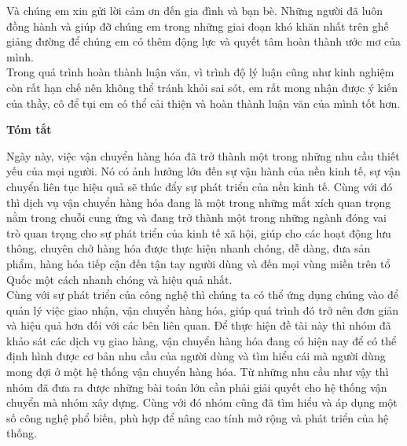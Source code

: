 	Và chúng em xin gửi lời cảm ơn đến gia đình và bạn bè. Những người đã luôn đồng hành và giúp đỡ chúng em trong những giai đoạn khó khăn nhất trên ghế giảng đường để chúng em có thêm động lực và quyết tâm hoàn thành ước mơ của mình.\\
	
	Trong quá trình hoàn thành luận văn, vì trình độ lý luận cũng như kinh nghiệm còn rất hạn chế nên không thể tránh khỏi sai sót, em rất mong nhận được ý kiến của thầy, cô để tụi em có thể cải thiện và hoàn thành luận văn của mình tốt hơn.\\

\newpage
\thispagestyle{plain}
\begin{center}
    \Large
    \textbf{Tóm tắt}
    \vspace{1cm}
\end{center}

Ngày này, việc vận chuyển hàng hóa đã trở thành một trong những nhu cầu thiết yếu của mọi người. Nó có ảnh hưởng lớn đến sự vận hành của nền kinh tế, sự vận chuyển liên tục hiệu quả sẽ thúc đẩy sự phát triển của nền kinh tế. Cùng với đó thì dịch vụ vận chuyển hàng hóa đang là một trong những mắt xích quan trọng nằm trong chuỗi cung ứng và đang trở thành một trong những ngành đóng vai trò quan trọng cho sự phát triển của kinh tế xã hội, giúp cho các hoạt động lưu thông, chuyên chở hàng hóa được thực hiện nhanh chóng, dễ dàng, đưa sản phẩm, hàng hóa tiếp cận đến tận tay người dùng và đến mọi vùng miền trên tổ Quốc một cách nhanh chóng và hiệu quả nhất.\\

Cùng với sự phát triển của công nghệ thì chúng ta có thể ứng dụng chúng vào để quản lý việc giao nhận, vận chuyển hàng hóa, giúp quá trình đó trở nên đơn giản và hiệu quả hơn đối với các bên liên quan. Để thực hiện đề tài này thì nhóm đã khảo sát các dịch vụ giao hàng, vận chuyển hàng hóa đang có hiện nay để có thể định hình được cơ bản nhu cầu của người dùng và tìm hiểu cái mà người dùng mong đợi ở một hệ thống vận chuyển hàng hóa. Từ những nhu cầu như vậy thì nhóm đã đưa ra được những bài toán lớn cần phải giải quyết cho hệ thống vận chuyển mà nhóm xây dựng. Cùng với đó nhóm cũng đã tìm hiểu và áp dụng một số công nghệ phổ biến, phù hợp để nâng cao tính mở rộng và phát triển của hệ thống.\\
